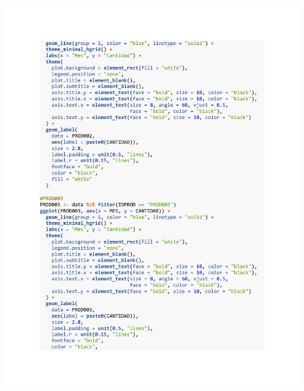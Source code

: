 \begin{figure}[h!]
        \begin{tcolorbox}[colback=white, colframe=black, boxrule=1.5pt, sharp corners=all]
            {\includegraphics[width=\linewidth, height=22cm, trim=2.5cm 2.5cm 2.5cm 2.5cm, clip]{images/script7.pdf}}
        \end{tcolorbox}
\end{figure}

